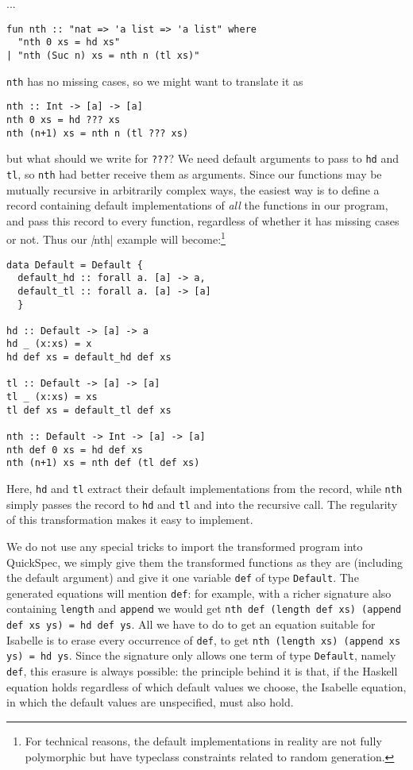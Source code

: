 ...

\begin{verbatim}
fun nth :: "nat => 'a list => 'a list" where
  "nth 0 xs = hd xs"
| "nth (Suc n) xs = nth n (tl xs)"
\end{verbatim}

\verb|nth| has no missing cases, so we might want to translate it as
\begin{verbatim}
nth :: Int -> [a] -> [a]
nth 0 xs = hd ??? xs
nth (n+1) xs = nth n (tl ??? xs)
\end{verbatim}
but what should we write for \verb|???|? We need default arguments to
pass to \verb|hd| and \verb|tl|, so \verb|nth| had better receive
them as arguments. Since our functions may be mutually recursive in
arbitrarily complex ways, the easiest way is to define a record
containing default implementations of \emph{all} the functions in our
program, and pass this record to every function, regardless of whether
it has missing cases or not. Thus our \emph|nth| example will become:\footnote{For
technical reasons, the default implementations in reality are not fully
polymorphic but have typeclass constraints related to random generation.}
\begin{verbatim}
data Default = Default {
  default_hd :: forall a. [a] -> a,
  default_tl :: forall a. [a] -> [a]
  }

hd :: Default -> [a] -> a
hd _ (x:xs) = x
hd def xs = default_hd def xs

tl :: Default -> [a] -> [a]
tl _ (x:xs) = xs
tl def xs = default_tl def xs

nth :: Default -> Int -> [a] -> [a]
nth def 0 xs = hd def xs
nth (n+1) xs = nth def (tl def xs)
\end{verbatim}
Here, \verb|hd| and \verb|tl| extract their default implementations
from the record, while \verb|nth| simply passes the record to \verb|hd|
and \verb|tl| and into the recursive call. The regularity of this
transformation makes it easy to implement.

We do not use any special tricks to import the transformed program into QuickSpec,
we simply give them the transformed functions as they are (including the default argument)
and give it one variable \verb|def| of type \verb|Default|. The generated equations
will mention \verb|def|: for example, with a richer signature also containing
\verb|length| and \verb|append| we would get
\verb|nth def (length def xs) (append def xs ys) = hd def ys|.
All we have to do to get an equation suitable for Isabelle is to erase
every occurrence of \verb|def|, to get
\verb|nth (length xs) (append xs ys) = hd ys|.
Since the signature only allows one term of type \verb|Default|, namely
\verb|def|, this erasure is always possible: the principle behind it is that,
if the Haskell equation holds regardless of which default values we choose,
the Isabelle equation, in which the default values are unspecified, must also hold.
